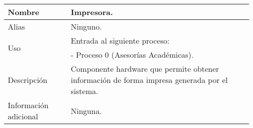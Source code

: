 \begin{center}
  \begin{tabular}{| l | p{9cm} |}
    \hline
    Nombre & \textbf{Impresora}.\\
    \hline
    Alias & Ninguno.\\
    \hline
    \multirow{2}{*}{Uso} & Entrada al siguiente proceso:\\
                         & - Proceso 0 (Asesorías Académicas).\\
    \hline
    Descripción & Componente hardware que permite obtener información de
                  forma impresa generada por el sistema.\\
    \hline
    Información adicional & Ninguna.\\
    \hline
  \end{tabular}
\end{center}

